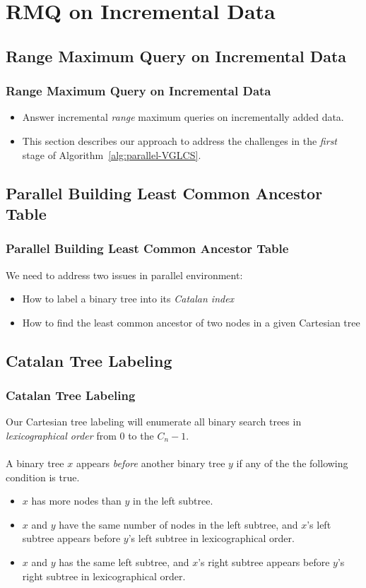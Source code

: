 \section{RMQ on Incremental Data}

\subsection{Range Maximum Query on Incremental Data}
\begin{frame}
    \frametitle{Range Maximum Query on Incremental Data}
    \begin{itemize}
    	\setlength\itemsep{1em}
    	\item
    		Answer incremental {\em range} maximum queries on
			incrementally added data.
    	\item
    		This section describes our approach to address the
			challenges in the {\em first} stage of
			Algorithm~\ref{alg:parallel-VGLCS}.
    \end{itemize}
\end{frame}

\subsection{Parallel Building Least Common Ancestor Table}
\begin{frame}
    \frametitle{Parallel Building Least Common Ancestor Table}
    We need to address two issues in parallel environment:
    \begin{itemize}
    	\setlength\itemsep{1em}
    	\item 
    		How to label a binary tree into its {\em Catalan index}
		\item 
			How to find the least common ancestor of two nodes in a
			given Cartesian tree
	\end{itemize}
\end{frame}

\subsection{Catalan Tree Labeling}
\begin{frame}
    \frametitle{Catalan Tree Labeling}
    Our Cartesian tree labeling will enumerate all binary search trees
	in {\em lexicographical order} from $0$ to the $C_n-1$.
	\\~\\
	A binary tree $x$ appears {\em before} another binary tree $y$ if
	any of the the following condition is true.
	\begin{itemize}
		\setlength\itemsep{1em}
		\item 
			$x$ has more nodes than $y$ in the left subtree.
		\item 
			$x$ and $y$ have the same number of nodes in the left
  			subtree, and $x$'s left subtree appears before $y$'s left
  			subtree in lexicographical order.
		\item 
			$x$ and $y$ has the same left subtree, and $x$'s right
	  		subtree appears before $y$'s right subtree in
	  		lexicographical order.
	\end{itemize}
\end{frame}

